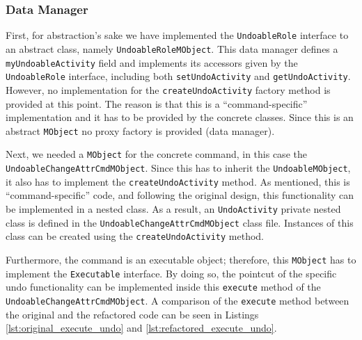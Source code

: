 \subsubsection{Data Manager}
First, for abstraction's sake we have implemented the \texttt{UndoableRole} interface to an abstract class, namely \texttt{UndoableRoleMObject}.
This data manager defines a \texttt{myUndoableActivity} field and implements its accessors given by the \texttt{UndoableRole} interface, including both \texttt{setUndoActivity} and \texttt{getUndoActivity}.
However, no implementation for the \texttt{createUndoActivity} factory method is provided at this point.
The reason is that this is a ``command-specific'' implementation and it has to be provided by the concrete classes.
Since this is an abstract \texttt{MObject} no proxy factory is provided (data manager).

Next, we needed a \texttt{MObject} for the concrete command, in this case the \texttt{UndoableChangeAttrCmdMObject}.
Since this has to inherit the \texttt{UndoableMObject}, it also has to implement the \texttt{createUndoActivity} method.
As mentioned, this is ``command-specific'' code, and following the original design, this functionality can be implemented in a nested class.
As a result, an \texttt{UndoActivity} private nested class is defined in the \texttt{UndoableChangeAttrCmdMObject} class file.
Instances of this class can be created using the \texttt{createUndoActivity} method.

Furthermore, the command is an executable object; therefore, this \texttt{MObject} has to implement the \texttt{Executable} interface.
By doing so, the pointcut of the specific undo functionality can be implemented inside this \texttt{execute} method of the \texttt{UndoableChangeAttrCmdMObject}.
A comparison of the \texttt{execute} method between the original and the refactored code can be seen in Listings \ref{lst:original_execute_undo} and \ref{lst:refactored_execute_undo}.
\newline
{}

